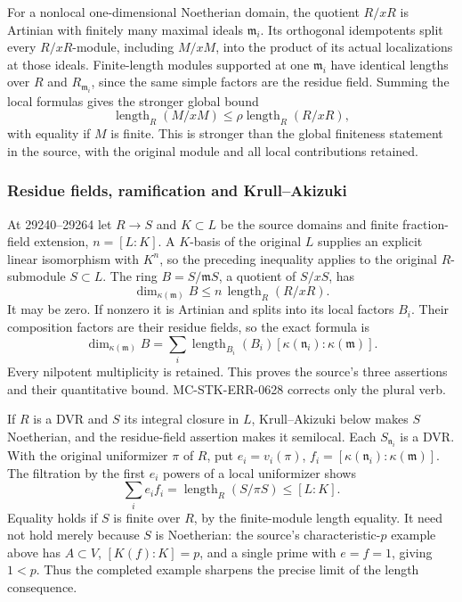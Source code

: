 For a nonlocal one-dimensional Noetherian domain, the quotient \(R/xR\) is Artinian with finitely many maximal ideals \(\mathfrak m_i\). Its orthogonal idempotents split every \(R/xR\)-module, including \(M/xM\), into the product of its actual localizations at those ideals. Finite-length modules supported at one \(\mathfrak m_i\) have identical lengths over \(R\) and \(R_{\mathfrak m_i}\), since the same simple factors are the residue field. Summing the local formulas gives the stronger global bound \[
 \operatorname{length}_R(M/xM)
 \le \rho\operatorname{length}_R(R/xR),
\] with equality if \(M\) is finite. This is stronger than the global finiteness statement in the source, with the original module and all local contributions retained.

\subsubsection{Residue fields, ramification and Krull--Akizuki}\label{residue-fields-ramification-and-krullakizuki}

At 29240--29264 let \(R\to S\) and \(K\subset L\) be the source domains and finite fraction-field extension, \(n=[L:K]\). A \(K\)-basis of the original \(L\) supplies an explicit linear isomorphism with \(K^n\), so the preceding inequality applies to the original \(R\)-submodule \(S\subset L\). The ring \(B=S/\mathfrak mS\), a quotient of \(S/xS\), has \[
 \dim_{\kappa(\mathfrak m)}B
 \le n\,\operatorname{length}_R(R/xR).
\] It may be zero. If nonzero it is Artinian and splits into its local factors \(B_i\). Their composition factors are their residue fields, so the exact formula is \[
 \dim_{\kappa(\mathfrak m)}B
 =\sum_i \operatorname{length}_{B_i}(B_i)
          [\kappa(\mathfrak n_i):\kappa(\mathfrak m)].
\] Every nilpotent multiplicity is retained. This proves the source's three assertions and their quantitative bound. MC-STK-ERR-0628 corrects only the plural verb.

If \(R\) is a DVR and \(S\) its integral closure in \(L\), Krull--Akizuki below makes \(S\) Noetherian, and the residue-field assertion makes it semilocal. Each \(S_{\mathfrak n_i}\) is a DVR. With the original uniformizer \(\pi\) of \(R\), put \(e_i=v_i(\pi)\), \(f_i=[\kappa(\mathfrak n_i):\kappa(\mathfrak m)]\). The filtration by the first \(e_i\) powers of a local uniformizer shows \[
 \sum_i e_i f_i
 =\operatorname{length}_R(S/\pi S)\le [L:K].
\] Equality holds if \(S\) is finite over \(R\), by the finite-module length equality. It need not hold merely because \(S\) is Noetherian: the source's characteristic-\(p\) example above has \(A\subset V\), \([K(f):K]=p\), and a single prime with \(e=f=1\), giving \(1<p\). Thus the completed example sharpens the precise limit of the length consequence.

